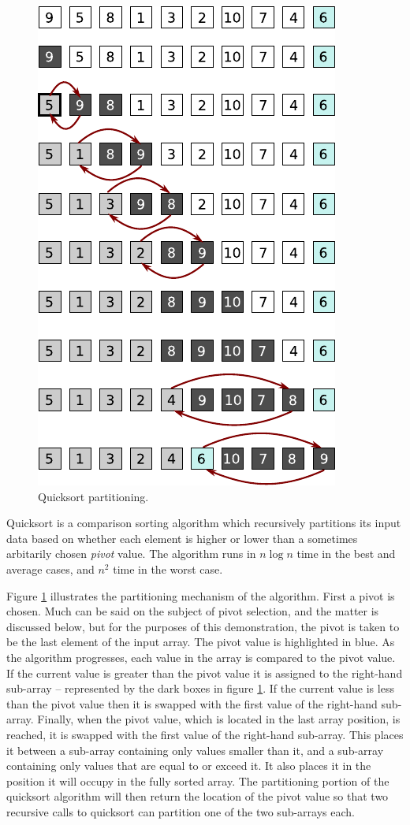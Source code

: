\documentclass[12pt, a4paper]{article}
\begin{document}
\begin{figure}
    \centering
    \includegraphics{quicksort.pdf}
    \caption{\label{fig:quicksort_1}Quicksort partitioning.}
\end{figure}

Quicksort is a comparison sorting algorithm which recursively partitions its input data based on whether each element is higher or lower than a sometimes arbitarily chosen \emph{pivot} value. The algorithm runs in $n\log n$ time in the best and average cases, and $n^{2}$ time in the worst case.

Figure \ref{fig:quicksort_1} illustrates the partitioning mechanism of the algorithm. First a pivot is chosen. Much can be said on the subject of pivot selection, and the matter is discussed below, but for the purposes of this demonstration, the pivot is taken to be the last element of the input array. The pivot value is highlighted in blue. As the algorithm progresses, each value in the array is compared to the pivot value. If the current value is greater than the pivot value it is assigned to the right-hand sub-array -- represented by the dark boxes in figure \ref{fig:quicksort_1}. If the current value is less than the pivot value then it is swapped with the first value of the right-hand sub-array. Finally, when the pivot value, which is located in the last array position, is reached, it is swapped with the first value of the right-hand sub-array. This places it between a sub-array containing only values smaller than it, and a sub-array containing only values that are equal to or exceed it. It also places it in the position it will occupy in the fully sorted array. The partitioning portion of the quicksort algorithm will then return the location of the pivot value so that two recursive calls to quicksort can partition one of the two sub-arrays each.
\end{document}
